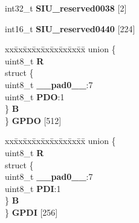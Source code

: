 \begin{DoxyCompactItemize}
\begin{tabbing}
\end{tabbing}\item 
\mbox{\label{structSIU__tag_af59c01843f4ebabfbe7b76667b4a3d09}} 
int32\+\_\+t {\bfseries S\+I\+U\+\_\+reserved0038} \mbox{[}2\mbox{]}
\item 
\mbox{\label{structSIU__tag_ae6cb218ac68010e78c97deebf714ce41}} 
int16\+\_\+t {\bfseries S\+I\+U\+\_\+reserved0440} \mbox{[}224\mbox{]}
\item 
\mbox{\label{structSIU__tag_a0548dad18d5130cdf240808e2e720856}} 
\begin{tabbing}
xx\=xx\=xx\=xx\=xx\=xx\=xx\=xx\=xx\=\kill
union \{\\
\>uint8\_t {\bfseries R}\\
\>struct \{\\
\>\>uint8\_t {\bfseries \_\_pad0\_\_}:7\\
\>\>uint8\_t {\bfseries PDO}:1\\
\>\} {\bfseries B}\\
\} {\bfseries GPDO} \mbox{[}512\mbox{]}\\

\end{tabbing}\item 
\mbox{\label{structSIU__tag_a8fa20fa9c1a84d15128097a3a32dfe89}} 
\begin{tabbing}
xx\=xx\=xx\=xx\=xx\=xx\=xx\=xx\=xx\=\kill
union \{\\
\>uint8\_t {\bfseries R}\\
\>struct \{\\
\>\>uint8\_t {\bfseries \_\_pad0\_\_}:7\\
\>\>uint8\_t {\bfseries PDI}:1\\
\>\} {\bfseries B}\\
\} {\bfseries GPDI} \mbox{[}256\mbox{]}\\


\end{tabbing}
\end{DoxyCompactItemize}
